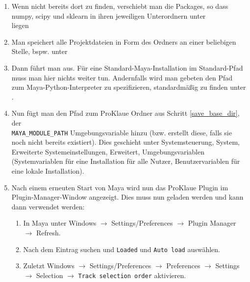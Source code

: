 \documentclass[a4paper, openany, oneside]{memoir}
\begin{document}
\begin{enumerate}[start=0]
\item Wenn nicht bereits dort zu finden, verschiebt man die Packages, so dass numpy, scipy und sklearn in ihren jeweiligen Unterordnern unter \\ liegen
\item \label{save_base_dir} Man speichert alle Projektdateien in Form des  Ordners an einer beliebigen Stelle, bspw. unter   
\item Dann führt man  aus. Für eine Standard-Maya-Installation im Standard-Pfad muss man hier nichts weiter tun. Andernfalls wird man gebeten den Pfad zum Maya-Python-Interpreter zu spezifizieren, standardmäßig zu finden unter .
\item Nun fügt man den Pfad zum ProKlaue Ordner aus Schritt \ref{save_base_dir}, der \\\texttt{MAYA\_MODULE\_PATH} Umgebungsvariable hinzu (bzw. erstellt diese, falls sie noch nicht bereits existiert). Dies geschieht unter Systemsteuerung, System, Erweiterte Systemeinstellungen, Erweitert, Umgebungsvariablen (Systemvariablen für eine Installation für alle Nutzer, Benutzervariablen für eine lokale Installation).
\item Nach einem erneuten Start von Maya wird nun das ProKlaue Plugin im Plugin-Manager-Window angezeigt. Dies muss nun geladen werden und kann dann verwendet werden: 
\begin{enumerate}
\item In Maya unter Windows \(\rightarrow\) Settings/Preferences \(\rightarrow\) Plugin Manager \(\rightarrow\) Refresh. 
\item Nach dem Eintrag  suchen und \texttt{Loaded} und \texttt{Auto load} auswählen. 
\item Zuletzt Windows \(\rightarrow\) Settings/Preferences \(\rightarrow\) Preferences \(\rightarrow\) Settings \(\rightarrow\) Selection \(\rightarrow\) \texttt{Track selection order} aktivieren.
\end{enumerate}
\end{enumerate}
 
\end{document}

